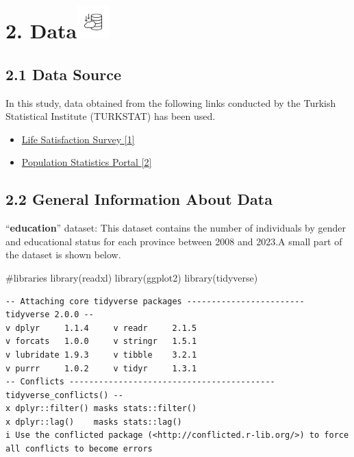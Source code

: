 \documentclass[
  11pt,
  a4paper,
  DIV=11,
  numbers=noendperiod]{scrartcl}
\newenvironment{Shaded}{\begin{snugshade}}{\end{snugshade}}
\newcommand{\CommentTok}[1]{\textcolor[rgb]{0.37,0.37,0.37}{#1}}
\newcommand{\FunctionTok}[1]{\textcolor[rgb]{0.28,0.35,0.67}{#1}}
\newcommand{\NormalTok}[1]{\textcolor[rgb]{0.00,0.23,0.31}{#1}}
\begin{document}
\section[2. Data\hfill
]{\texorpdfstring{2.
Data\protect\includegraphics[width=0.5in,height=\textheight,keepaspectratio]{assets/images/data.png}\hfill
}{2. Data}}\label{data}

\subsection{2.1 Data Source}\label{data-source}

In this study, data obtained from the following links conducted by the
Turkish Statistical Institute (TURKSTAT) has been used.

\begin{itemize}
\item
  \href{https://www.tuik.gov.tr/}{Life Satisfaction Survey {[}1{]}}
\item
  \href{https://nip.tuik.gov.tr/}{Population Statistics Portal {[}2{]}}
\end{itemize}

\subsection{2.2 General Information About
Data}\label{general-information-about-data}

{``\textbf{education}''} dataset: This dataset contains the number of
individuals by gender and educational status for each province between
2008 and 2023.A small part of the dataset is shown below.

\begin{Shaded}
\begin{Highlighting}[]
\CommentTok{\#libraries}
\FunctionTok{library}\NormalTok{(readxl)}
\FunctionTok{library}\NormalTok{(ggplot2)}
\FunctionTok{library}\NormalTok{(tidyverse)}
\end{Highlighting}
\end{Shaded}

\begin{verbatim}
-- Attaching core tidyverse packages ------------------------ tidyverse 2.0.0 --
v dplyr     1.1.4     v readr     2.1.5
v forcats   1.0.0     v stringr   1.5.1
v lubridate 1.9.3     v tibble    3.2.1
v purrr     1.0.2     v tidyr     1.3.1
-- Conflicts ------------------------------------------ tidyverse_conflicts() --
x dplyr::filter() masks stats::filter()
x dplyr::lag()    masks stats::lag()
i Use the conflicted package (<http://conflicted.r-lib.org/>) to force all conflicts to become errors
\end{verbatim}
\end{document}
